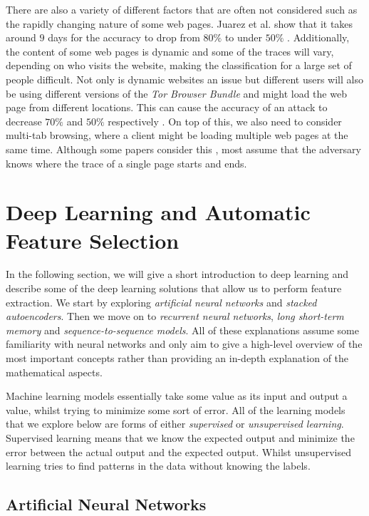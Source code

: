 There are also a variety of different factors that are often not considered such as the rapidly changing nature of some web pages.
Juarez et al. show that it takes around $9$ days for the accuracy to drop from $80\%$ to under $50\%$ \cite{wfpevaluation}.
Additionally, the content of some web pages is dynamic and some of the traces will vary, depending on who visits the website, making the classification for a large set of people difficult.
Not only is dynamic websites an issue but different users will also be using different versions of the \textit{Tor Browser Bundle} and might load the web page from different locations.
This can cause the accuracy of an attack to decrease $70\%$ and $50\%$ respectively \cite{wfpevaluation}.
On top of this, we also need to consider multi-tab browsing, where a client might be loading multiple web pages at the same time.
Although some papers consider this \cite{naivebayes}, most assume that the adversary knows where the trace of a single page starts and ends.

\section{Deep Learning and Automatic Feature Selection}

In the following section, we will give a short introduction to deep learning and describe some of the deep learning solutions that allow us to perform feature extraction.
We start by exploring \textit{artificial neural networks} and \textit{stacked autoencoders}.
Then we move on to \textit{recurrent neural networks}, \textit{long short-term memory} and \textit{sequence-to-sequence models}.
All of these explanations assume some familiarity with neural networks and only aim to give a high-level overview of the most important concepts rather than providing an in-depth explanation of the mathematical aspects.

Machine learning models essentially take some value as its input and output a value, whilst trying to minimize some sort of error.
All of the learning models that we explore below are forms of either \textit{supervised} or \textit{unsupervised learning}.
Supervised learning means that we know the expected output and minimize the error between the actual output and the expected output.
Whilst unsupervised learning tries to find patterns in the data without knowing the labels.

\subsection{Artificial Neural Networks}

